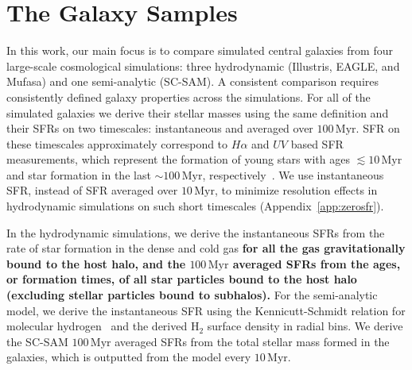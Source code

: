 \documentclass[tighten, preprint]{aastex62}
\begin{document}

\section{The Galaxy Samples} \label{sec:galsims}%
In this work, our main focus is to compare simulated central galaxies 
from four large-scale cosmological simulations: three hydrodynamic 
(Illustris, EAGLE, and {\sc Mufasa}) and one semi-analytic (SC-SAM). 
A consistent comparison requires consistently defined galaxy properties
across the simulations. For all of the simulated galaxies we derive 
their stellar masses using the same definition and their SFRs on two 
timescales: instantaneous and averaged over $100\,\mathrm{Myr}$. SFR 
on these timescales approximately correspond to $H{\alpha}$ 
and $UV$ based SFR measurements, which represent the formation of young 
stars with ages ${\lesssim}10\,\mathrm{Myr}$ and star formation in the 
last ${\sim}100\,\mathrm{Myr}$, respectively~\citep[e.g.][]{kennicutt2012}. 
We use instantaneous SFR, instead of SFR averaged over 
$10\,\mathrm{Myr}$, to minimize resolution effects in hydrodynamic 
simulations on such short timescales (Appendix~\ref{app:zerosfr}).

In the hydrodynamic simulations, we derive the instantaneous SFRs from 
the rate of star formation in the dense and cold gas 
{\bf \color{red} 
for all the gas gravitationally bound to the host halo, and the 
$100\,\mathrm{Myr}$ averaged SFRs from the ages, or formation times, 
of all star particles  bound to the host halo (excluding stellar 
particles bound to subhalos).
} 
For the semi-analytic model, we derive the 
instantaneous SFR using the Kennicutt-Schmidt relation for molecular 
hydrogen~\citep[based on][]{bigiel2008} and the derived H$_2$ surface 
density in radial bins. We derive the SC-SAM $100\,\mathrm{Myr}$ averaged SFRs 
from the total stellar mass formed in the galaxies, which is outputted 
from the model every $10\,\mathrm{Myr}$. 
\end{document}
